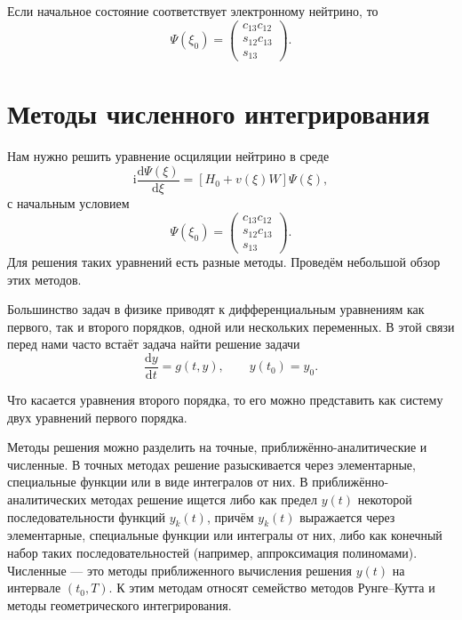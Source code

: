 \documentclass[a4paper,12pt]{article}
\newcommand{\dd}{\mathrm{d}}
\renewcommand{\imath}{\mathrm{i}}
\begin{document}
	Если начальное состояние соответствует электронному нейтрино, то
		\begin{equation}\label{eq:19}
  		\Psi(\xi_0)=
  		\begin{pmatrix}
  		c_{13}c_{12}\\
  		 s_{12}c_{13}\\
  		 s_{13}
  		\end{pmatrix}.
  	\end{equation}

	\newpage
	\section{Методы численного интегрирования}

	Нам нужно решить уравнение осциляции нейтрино в среде
	\begin{equation}\label{eq:15}
		\imath\frac{\dd\Psi(\xi)}{\dd\xi}=[H_{0}+ v(\xi)W]\Psi(\xi),
	\end{equation}
	с начальным условием
	\begin{equation}\label{eq:19}
		\Psi(\xi_0)=
		\begin{pmatrix}
			c_{13}c_{12}\\
			s_{12}c_{13}\\
			s_{13}
		\end{pmatrix}.
	\end{equation}
	 Для решения таких уравнений есть
	разные методы. Проведём небольшой обзор этих методов.

  Большинство задач в физике приводят к дифференциальным уравнениям как первого,
	так и второго порядков, одной или нескольких переменных. В этой связи перед
	нами часто встаёт задача найти решение задачи
	\begin{equation}\label{eq:21}
		\frac{\dd y}{\dd t}=g(t,y),\qquad y(t_0)=y_0.
	\end{equation}

	Что касается уравнения второго порядка, то его можно представить как систему
двух уравнений первого порядка.

	Методы решения  можно разделить на точные, приближённо-аналитические и
	численные. В точных методах решение разыскивается через элементарные,
	специальные функции или в виде интегралов от них.
  В приближённо-аналитических методах решение ищется либо как предел
  \(y(t)\) некоторой последовательности функций \(y_k(t)\), причём \(y_k(t)\)
  выражается через элементарные, специальные функции или интегралы от них, либо
  как конечный набор таких последовательностей (например, аппроксимация
  полиномами).
  Численные — это методы приближенного вычисления решения \(y(t)\) на
  интервале \((t_0,T)\). К этим методам относят семейство методов Рунге--Кутта и
  методы геометрического интегрирования.
\end{document}
